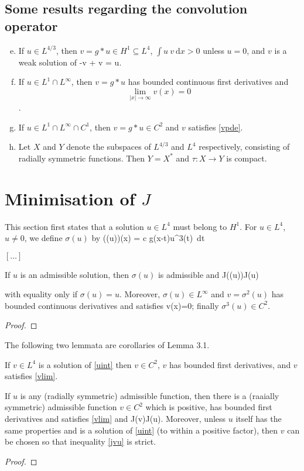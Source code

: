 \subsection{Some results regarding the convolution operator} 
\begin{enumerate}[a)] \setcounter{enumi}{4} 
    \item If $u\in L^{4/3}$, then $v = g\ast u \in H^1\subseteq L^4$, $\int u~v~\mathrm{d} x>0$ unless $u=0$, and $v$ is a weak solution of \be \label{vpde} -\Delta v + v = u. \ee 
    \item If $u \in L^1\cap L^\infty$, then $v = g\ast u$ has bounded continuous
        first derivatives and $$\underset{|x|\to\infty}{\lim} v(x) = 0$$.  
    \item If $u\in L^1\cap L^\infty\cap C^1$, then $v = g\ast u\in
        C^2$ and $v$ satisfies \eqref{vpde}.  
    \item Let $X$ and $Y$ denote the subspaces of $L^{4/3}$ and $L^4$ respectively, consisting of radially symmetric
functions. Then $Y = X^\ast$ and $\tau : X \to Y$ is compact.  
\end{enumerate}

\section{Minimisation of $J$}
This section first states that a solution $u\in L^4$ must belong to $H^1$.
For $u\in L^4$, $u\neq 0$, we define $\sigma(u)$ by 
\be \label{sigmadef} \left(\sigma(u)\right)(x) = c \int g(x-t)u^3(t)~dt \ee

$[\ldots]$

\begin{lemma} 
If $u$ is an admissible solution, then $\sigma(u)$ is admissible and
\be\label{jsigma}
J(\sigma(u))\leq J(u)
\ee

with equality only if $\sigma(u) = u$. Moreover, $\sigma(u)\in L^\infty$ 
and $v=\sigma^2(u)$ has bounded continuous derivatives and satisfies
\be\label{vlim}
 v(x)=0;
\ee
finally $\sigma^3(u)\in C^2$.
\end{lemma}
\begin{proof}
\end{proof}

The following two lemmata are corollaries of Lemma 3.1.
\begin{lemma} 
    If $v\in L^4$ is a solution of \eqref{uint} then $v\in C^2$, $v$ has
    bounded first derivatives, and $v$ satisfies \eqref{vlim}.
\end{lemma}
\begin{lemma} 
    If $u$ is any (radially symmetric) admissible function, then there is a
    (raaially symmetric) admissible function $v\in C^2$ which is positive, has
    bounded first derivatives and satisfies \eqref{vlim} and 
\be\label{jvu}
J(v)\leq J(u).
\ee
    Moreover, unless $u$ itself has the same properties and is a solution of 
    \eqref{uint} (to within a positive factor), then $v$ can be chosen so that
    inequality \eqref{jvu} is strict.
\end{lemma}
\begin{proof}
\end{proof}

